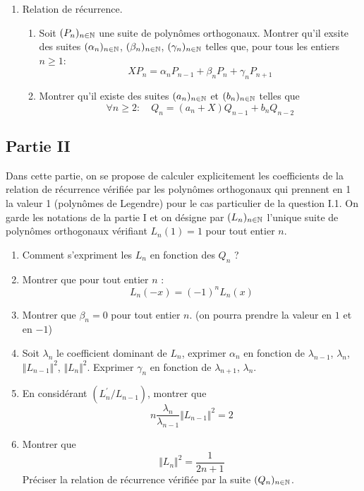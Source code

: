 \begin{enumerate}
\item Relation de récurrence.
\begin{enumerate}
 \item Soit $(P_n)_{n\in \mathbb{N}}$ une suite de polynômes orthogonaux. Montrer qu'il exsite des suites $(\alpha_n)_{n\in \mathbb{N}}$, $(\beta_n)_{n\in \mathbb{N}}$, $(\gamma_n)_{n\in \mathbb{N}}$ telles que, pour tous les entiers $n\geq1$:
\begin{displaymath}
 XP_n = \alpha_n P_{n-1}+ \beta_n P_n +\gamma_n P_{n+1}
\end{displaymath}
\item Montrer qu'il existe des suites $(a_n)_{n\in \mathbb{N}}$ et $(b_n)_{n\in \mathbb{N}}$ telles que 
\begin{displaymath}
 \forall n\geq 2 : \quad Q_n = (a_n + X)Q_{n-1}+b_nQ_{n-2}
\end{displaymath}


\end{enumerate}

\end{enumerate}

\subsection*{Partie II}
Dans cette partie, on se propose de calculer explicitement les coefficients de la relation de récurrence vérifiée par les polynômes orthogonaux qui prennent en 1 la valeur 1 (polynômes de Legendre) pour le cas particulier de la question I.1.\newline
On garde les notations de la partie I et on désigne par $(L_n)_{n\in \mathbb{N}}$ l'unique suite de polynômes orthogonaux vérifiant $L_n(1)=1$ pour tout entier $n$. 
\begin{enumerate}
 \item Comment s'expriment les $L_n$ en fonction des $Q_n$ ?
 \item Montrer que pour tout entier $n$ : 
\begin{displaymath}
L_n(-x)= (-1)^n L_n(x)
\end{displaymath}
\item Montrer que $\beta_n=0$ pour tout entier $n$. (on pourra prendre la valeur en $1$ et en $-1$)
\item Soit $\lambda_n$ le coefficient dominant de $L_n$, exprimer $\alpha_n$ en fonction de $\lambda_{n-1}$, $\lambda_{n}$, $\Vert L_{n-1}\Vert ^2$, $\Vert L_{n}\Vert ^2$. Exprimer $\gamma_n$ en fonction de $\lambda_{n+1}$, $\lambda_{n}$.

\item En considérant $(L_n^\prime / L_{n-1})$, montrer que
\begin{displaymath}
 n\frac{\lambda_n}{\lambda_{n-1}} \Vert L_{n-1} \Vert^2 = 2
\end{displaymath}

\item Montrer que
\begin{displaymath}
 \Vert L_n \Vert ^2 = \frac{1}{2n+1}
\end{displaymath}
Préciser la relation de récurrence vérifiée par la suite $(Q_n)_{n\in \mathbb{N}}$.
\end{enumerate}

